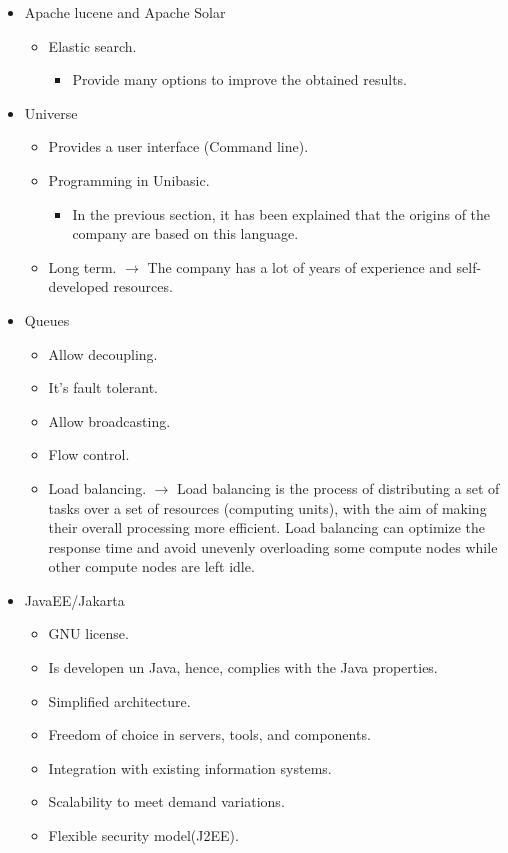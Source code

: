 \documentclass[12pt]{article}
\begin{document}
\begin{itemize}
\begin{itemize}
    \end{itemize}
    \item Apache lucene and Apache Solar
    \begin{itemize}
        \item Elastic search.
        \begin{itemize}
            \item Provide many options to improve the obtained results.
        \end{itemize}
    \end{itemize}
    \item Universe
    \begin{itemize}
        \item Provides a user interface (Command line).
        \item Programming in Unibasic.
        \begin{itemize}
            \item In the previous section, it has been explained that the origins of the company are based on this language.
        \end{itemize}
        \item Long term. $\longrightarrow$ The company has a lot of years of experience and self-developed resources.
    \end{itemize}
    \item Queues
    \begin{itemize}
        \item Allow decoupling.
        \item It's fault tolerant.
        \item Allow broadcasting.
        \item Flow control.
        \item Load balancing. $\longrightarrow$ Load balancing is the process of distributing a set of tasks over a set of resources (computing units), with the aim of making their overall processing more efficient. Load balancing can optimize the response time and avoid unevenly overloading some compute nodes while other compute nodes are left idle.
    \end{itemize}
    \item JavaEE/Jakarta
    \begin{itemize}
        \item GNU license.
        \item Is developen un Java, hence, complies with the Java properties.
        \item Simplified architecture.
        \item Freedom of choice in servers, tools, and components.
        \item Integration with existing information systems.
        \item Scalability to meet demand variations.
        \item Flexible security model(J2EE).
    \end{itemize}
\end{itemize}
\end{document}
